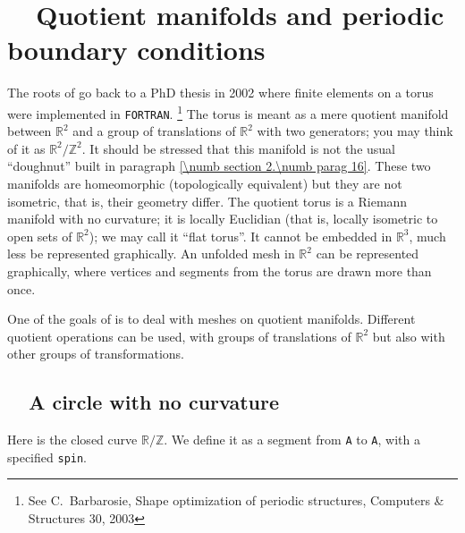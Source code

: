 
\chapter{~~Quotient manifolds and periodic boundary conditions}
\label{\numb section 7}


The roots of {\maniFEM} go back to a PhD thesis in 2002
where finite elements on a torus were implemented in {\small\tt FORTRAN}.%
\footnote{See %
C.~Barbarosie, Shape optimization of periodic structures,
Computers \& Structures 30, 2003}
The torus is meant as a mere quotient manifold between $ \mathbb{R}^2 $ and a group of
translations of $ \mathbb{R}^2 $ with two generators;
you may think of it as $ {\mathbb R}^2/{\mathbb Z}^2 $.
It should be stressed that this manifold is not the usual ``doughnut'' built in paragraph
\ref{\numb section 2.\numb parag 16}.
These two manifolds are homeomorphic (topologically equivalent) but they are not isometric,
that is, their geometry differ.
The quotient torus is a Riemann manifold with no curvature; it is locally Euclidian
(that is, locally isometric to open sets of $ \mathbb{R}^2 $); we may call it ``flat torus''.
It cannot be embedded in $ \mathbb{R}^3 $, much less be represented graphically.
An unfolded mesh in $ \mathbb{R}^2 $ can be represented graphically, where vertices and segments
from the torus are drawn more than once.

One of the goals of {\maniFEM} is to deal with meshes on quotient manifolds.
Different quotient operations can be used, with groups of translations of $ \mathbb{R}^2 $ but also
with other groups of transformations.


\section{~~A circle with no curvature}\label{\numb section 7.\numb parag 1}

Here is the closed curve $ \mathbb{R}/{\mathbb Z} $.
We define it as a segment from {\small\tt A} to {\small\tt A}, with a specified {\small\tt spin}.

